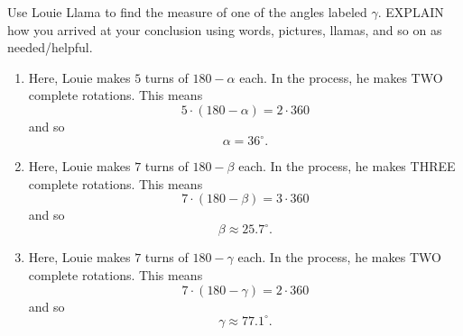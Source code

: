\documentclass[nooutcomes,noauthor,hints,handout]{ximera}
\begin{document}
\begin{question}
\begin{enumerate}
\begin{center}
\begin{tikzpicture}
      \end{tikzpicture}
    \end{center}
    Use Louie Llama to find the measure of one of the angles labeled
    $\gamma$. EXPLAIN how you arrived at your conclusion using words,
    pictures, llamas, and so on as needed/helpful.
  \end{enumerate}
  \begin{freeResponse}
    \begin{enumerate}
    \item Here, Louie makes $5$ turns of $180-\alpha$ each. In
      the process, he makes TWO complete rotations. This means
      \[
      5\cdot (180-\alpha) = 2\cdot 360
      \]
      and so
      \[
      \alpha= 36^\circ.
      \]
    \item Here, Louie makes $7$ turns of $180-\beta$ each. In
      the process, he makes THREE complete rotations. This means
      \[
      7\cdot (180-\beta) = 3\cdot 360
      \]
      and so
      \[
      \beta\approx 25.7^\circ.
      \]
    \item Here, Louie makes $7$ turns of $180-\gamma$ each. In
      the process, he makes TWO complete rotations. This means
      \[
      7\cdot (180-\gamma) = 2\cdot 360
      \]
      and so
      \[
      \gamma\approx 77.1^\circ.
      \]
    \end{enumerate}
  \end{freeResponse}
\end{question}



        
\end{document}
